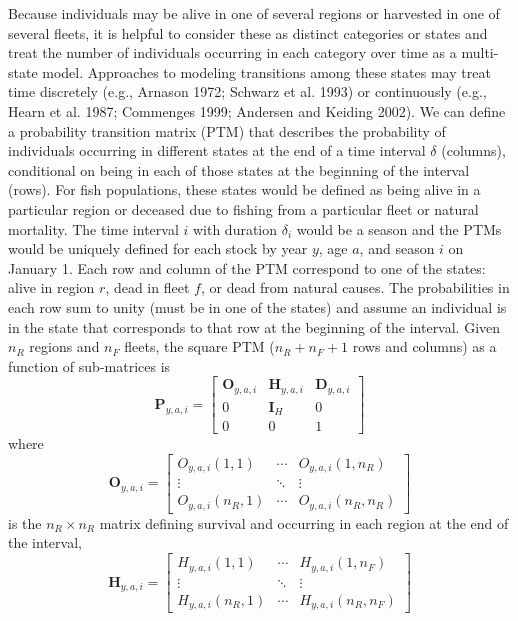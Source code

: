 \documentclass[
]{article}
\providecommand{\DIFaddtex}[1]{{\protect\color{blue}\uwave{#1}}} %
\providecommand{\DIFaddbegin}{} %
\providecommand{\DIFaddend}{} %
\providecommand{\DIFadd}[1]{\texorpdfstring{\DIFaddtex{#1}}{#1}} %
\newcommand{\DIFaddincludegraphics}[2][]{{\color{blue}\fbox{\DIFOincludegraphics[#1]{#2}}}} %
\DeclareRobustCommand{\DIFaddbegin}{\DIFOaddbegin \let\includegraphics\DIFaddincludegraphics} %
\DeclareRobustCommand{\DIFaddend}{\DIFOaddend \let\includegraphics\DIFOincludegraphics} %
\begin{document}
Because individuals may be alive in one of several regions or harvested in one of several fleets, it is helpful to consider these as distinct categories or states and treat the number of individuals occurring in each category over time as a multi-state model. Approaches to modeling transitions among these states may treat time discretely (e.g., Arnason 1972; Schwarz et al. 1993) or continuously (e.g., Hearn et al. 1987; Commenges 1999; Andersen and Keiding 2002). We can define a probability transition matrix (PTM) that describes the probability of individuals occurring in different states at the end of a time interval \DIFaddbegin \DIFadd{with duration }\DIFaddend \(\delta\) (columns), conditional on being in each of those states at the beginning of the interval (rows). For fish populations, these states would be defined as being alive in a particular region or deceased due to fishing from a particular fleet or natural mortality. The time interval \(i\) with duration \(\delta_i\) would be a season and the PTMs would be uniquely defined for each stock by year \(y\), age \(a\), and season \(i\) on January 1. Each row and column of the PTM correspond to one of the states: alive in region \(r\), dead in fleet \(f\), or dead from natural causes. The probabilities in each row sum to unity (must be in one of the states) and assume an individual is in the state that corresponds to that row at the beginning of the interval. Given \(n_R\) regions and \(n_F\) fleets, the square PTM (\(n_R + n_F + 1\) rows and columns) as a function of sub-matrices is
\begin{equation}\label{eq:ptm}
  \mathbf{P}_{y,a,i} = \begin{bmatrix}
    \mathbf{O}_{y,a,i} & \mathbf{H}_{y,a,i} & \mathbf{D}_{y,a,i} \\
    0 & \mathbf{I}_{H} & 0\\
    0 & 0 & 1
  \end{bmatrix}
\end{equation}
where
\begin{equation*}
  \mathbf{O}_{y,a,i} = 
  \begin{bmatrix}
    O_{y,a,i}(1,1) & \cdots & O_{y,a,i}(1,n_R) \\
    \vdots & \ddots & \vdots \\
    O_{y,a,i}(n_R,1) & \cdots & O_{y,a,i}(n_R,n_R)
  \end{bmatrix}
\end{equation*}
is the \(n_R \times n_R\) matrix defining survival and occurring in each region at the end of the interval,
\begin{equation*} 
  \mathbf{H}_{y,a,i} = 
  \begin{bmatrix}
    H_{y,a,i}(1,1) & \cdots & H_{y,a,i}(1,n_F) \\
    \vdots & \ddots & \vdots \\
    H_{y,a,i}(n_R,1) & \cdots & H_{y,a,i}(n_R,n_F)
  \end{bmatrix}
\end{equation*}
\end{document}
